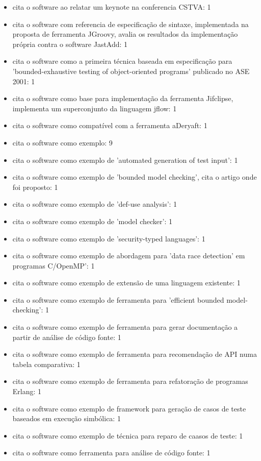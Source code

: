 \begin{itemize}
\item cita o software ao relatar um keynote na conferencia CSTVA: 1
\item cita o software com referencia de especificação de sintaxe, implementada na proposta de ferramenta JGroovy, avalia os resultados da implementação própria contra o software JastAdd: 1
\item cita o software como a primeira técnica baseada em especificação para 'bounded-exhaustive testing of object-oriented programs' publicado no ASE 2001: 1
\item cita o software como base para implementação da ferramenta Jifclipse, implementa um superconjunto da linguagem jflow: 1
\item cita o software como compatível com a ferramenta aDeryaft: 1
\item cita o software como exemplo: 9
\item cita o software como exemplo de 'automated generation of test input': 1
\item cita o software como exemplo de 'bounded model checking', cita o artigo onde foi proposto: 1
\item cita o software como exemplo de 'def-use analysis': 1
\item cita o software como exemplo de 'model checker': 1
\item cita o software como exemplo de 'security-typed languages': 1
\item cita o software como exemplo de abordagem para 'data race detection' em programas C/OpenMP': 1
\item cita o software como exemplo de extensão de uma linguagem existente: 1
\item cita o software como exemplo de ferramenta para 'efficient bounded model-checking': 1
\item cita o software como exemplo de ferramenta para gerar documentação a partir de análise de código fonte: 1
\item cita o software como exemplo de ferramenta para recomendação de API numa tabela comparativa: 1
\item cita o software como exemplo de ferramenta para refatoração de programas Erlang: 1
\item cita o software como exemplo de framework para geração de casos de teste baseados em execução simbólica: 1
\item cita o software como exemplo de técnica para reparo de caasos de teste: 1
\item cita o software como ferramenta para análise de código fonte: 1

\end{itemize}
